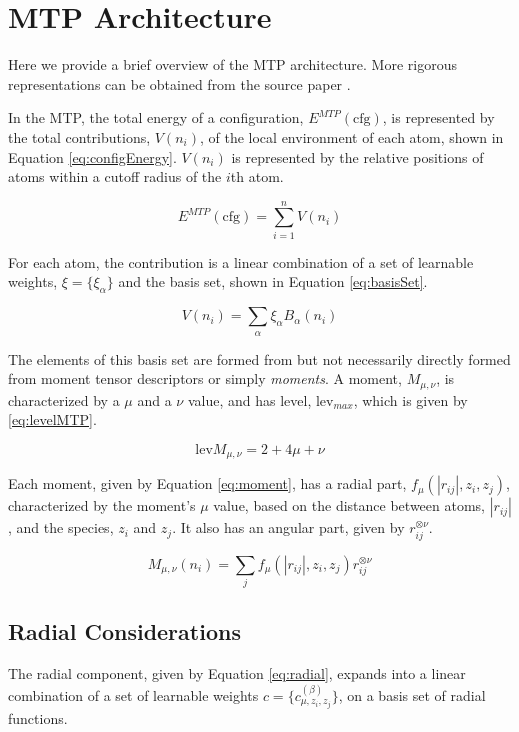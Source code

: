 \documentclass[9pt,twocolumn,twoside]{opticajnl}
\begin{document}
\section{MTP Architecture}
Here we provide a brief overview of the MTP architecture. More rigorous representations can be obtained from the source paper \cite{mtp}.

In the MTP, the total energy of a configuration, $E^{MTP} (\textrm{cfg}) $, is represented by the total contributions, $V(n_i)$, of the local environment of each atom, shown in Equation \ref{eq:configEnergy}.  $V(n_i)$ is represented by the relative positions of atoms within a cutoff radius of the $i$th atom.

\begin{equation} \label{eq:configEnergy}
  E^{MTP} (\textrm{cfg}) = \sum_{i=1}^{n} V(n_i)
\end{equation}

For each atom, the contribution is a linear combination of a set of learnable weights, $\xi = \{\xi_\alpha\}$ and the basis set, shown in Equation \ref{eq:basisSet}.

\begin{equation} \label{eq:basisSet}
  V(n_i) = \sum_{\alpha} \xi_\alpha   B_\alpha (n_i)
\end{equation}

The elements of this basis set are formed from but not necessarily directly formed from moment tensor descriptors or simply \textit{moments}. A moment, $M_{\mu,\nu}$,  is characterized by a $\mu$ and a $\nu$ value, and has level, $\textrm{lev}_{max}$, which is given by \ref{eq:levelMTP}.

\begin{equation} \label{eq:levelMTP}
  \textrm{lev}M_{\mu,\nu} = 2 + 4\mu + \nu
\end{equation}

Each moment, given by Equation \ref{eq:moment}, has a radial part, $f_\mu (|r_{ij}|,z_i,z_j) $, characterized by the moment's $\mu$ value,  based on the distance between atoms, $|r_{ij}|$, and the species, $z_i$ and $z_j$. It also has an angular part, given by $r_{ij} ^{\otimes \nu}$.

\begin{equation} \label{eq:moment}
  M_{\mu,\nu} (n_i)= \sum_{j} f_\mu (|r_{ij}|,z_i,z_j) r_{ij} ^{\otimes \nu}
\end{equation}

\subsection{Radial Considerations}
The radial component, given by Equation \ref{eq:radial}, expands into a linear combination of a set of learnable weights $c = \{c^{(\beta)} _ {\mu,z_i,z_j} \}$, on a basis set of radial functions.
\end{document}
